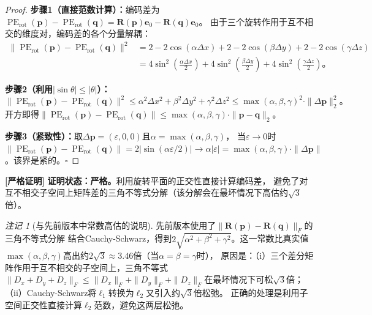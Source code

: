 \documentclass[11pt,a4paper]{article}
\theoremstyle{remark}
\newtheorem{remark}[theorem]{注记}
\DeclareMathOperator{\PE}{PE}
\newcommand{\rigorous}{\textnormal{\textbf{[严格证明]}}}
\begin{document}
\begin{proof}
\textbf{步骤1（直接范数计算）：}编码差为
$\PE_{\text{rot}}(\mathbf{p}) - \PE_{\text{rot}}(\mathbf{q})
 = \mathbf{R}(\mathbf{p})\mathbf{e}_0 - \mathbf{R}(\mathbf{q})\mathbf{e}_0$。
由于三个旋转作用于互不相交的维度对，编码差的各个分量解耦：
\begin{align}
    \|\PE_{\text{rot}}(\mathbf{p}) - \PE_{\text{rot}}(\mathbf{q})\|^2
    &= 2 - 2\cos(\alpha\Delta x) + 2 - 2\cos(\beta\Delta y) + 2 - 2\cos(\gamma\Delta z) \nonumber\\
    &= 4\sin^2\!\left(\frac{\alpha\Delta x}{2}\right)
     + 4\sin^2\!\left(\frac{\beta\Delta y}{2}\right)
     + 4\sin^2\!\left(\frac{\gamma\Delta z}{2}\right)。
\end{align}

\textbf{步骤2（利用$|\sin\theta| \leq |\theta|$）：}
\begin{equation}
    \|\PE_{\text{rot}}(\mathbf{p}) - \PE_{\text{rot}}(\mathbf{q})\|^2
    \leq \alpha^2\Delta x^2 + \beta^2\Delta y^2 + \gamma^2\Delta z^2
    \leq \max(\alpha, \beta, \gamma)^2 \cdot \|\Delta\mathbf{p}\|_2^2。
\end{equation}
开方即得$\|\PE_{\text{rot}}(\mathbf{p}) - \PE_{\text{rot}}(\mathbf{q})\|
 \leq \max(\alpha, \beta, \gamma) \cdot \|\mathbf{p} - \mathbf{q}\|_2$。

\textbf{步骤3（紧致性）：}取$\Delta\mathbf{p} = (\varepsilon, 0, 0)$且$\alpha = \max(\alpha, \beta, \gamma)$，
当$\varepsilon \to 0$时$\|\PE_{\text{rot}}(\mathbf{p}) - \PE_{\text{rot}}(\mathbf{q})\|
= 2|\sin(\alpha\varepsilon/2)| \to \alpha|\varepsilon|
= \max(\alpha, \beta, \gamma) \cdot \|\Delta\mathbf{p}\|$。该界是紧的。\hfill $\square$
\end{proof}

\rigorous{} \textbf{证明状态：严格。}利用旋转平面的正交性直接计算编码差，
避免了对互不相交子空间上矩阵差的三角不等式分解（该分解会在最坏情况下高估约$\sqrt{3}$倍）。

\begin{remark}[与先前版本中常数高估的说明]
\label{rem:1.3.1}
先前版本使用了$\|\mathbf{R}(\mathbf{p}) - \mathbf{R}(\mathbf{q})\|_F$的三角不等式分解
结合Cauchy-Schwarz，得到$2\sqrt{\alpha^2 + \beta^2 + \gamma^2}$。这一常数比真实值
$\max(\alpha, \beta, \gamma)$高出约$2\sqrt{3} \approx 3.46$倍（当$\alpha=\beta=\gamma$时），
原因是：（i）三个差分矩阵作用于互不相交的子空间上，三角不等式$\|D_x+D_y+D_z\|_F
\leq \|D_x\|_F + \|D_y\|_F + \|D_z\|_F$在最坏情况下可松$\sqrt{3}$倍；
（ii）Cauchy-Schwarz将$\ell_1$转换为$\ell_2$又引入约$\sqrt{3}$倍松弛。
正确的处理是利用子空间正交性直接计算$\ell_2$范数，避免这两层松弛。
\end{remark}
\end{document}
